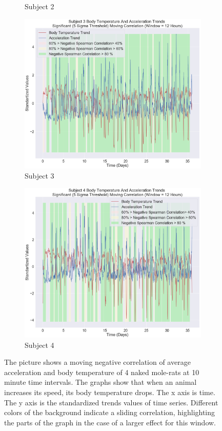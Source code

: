 \documentclass[14pt,a4paper]{scrartcl}
\begin{document}
\begin{figure}
\begin{subfigure}[b]{0.4\linewidth}
    \caption{Subject 2}
  \end{subfigure}
  \begin{subfigure}[b]{0.4\linewidth}
    \includegraphics[width=\linewidth]{exp3_3.png}
    \caption{Subject 3}
  \end{subfigure}
  \begin{subfigure}[b]{0.4\linewidth}
    \includegraphics[width=\linewidth]{exp3_4.png}
    \caption{Subject 4}
  \end{subfigure}
  \caption{The picture shows a moving negative correlation of average acceleration and body temperature of 4 naked mole-rats at 10 minute time intervals. The graphs show that when an animal increases its speed, its body temperature drops. The x axis is time. The y axis is the standardized trends values of time series. Different colors of the background indicate a sliding correlation, highlighting the parts of the graph in the case of a larger effect for this window.
}
  \label{fig:exp3}
\end{figure}
\end{document}
